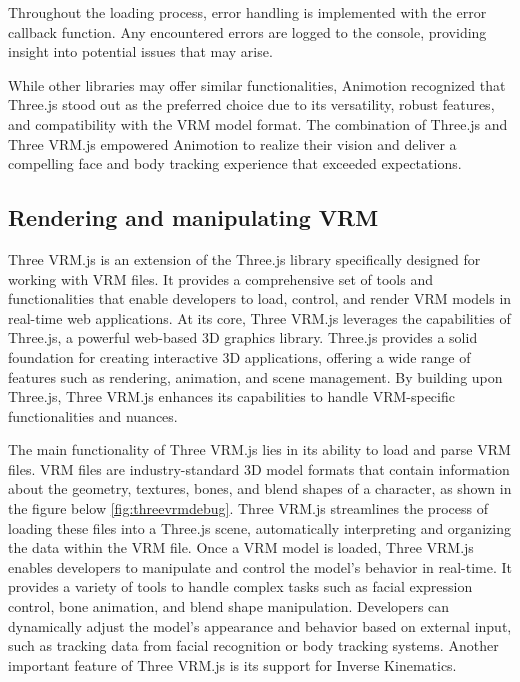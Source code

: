 Throughout the loading process, error handling is implemented with the error callback function. Any encountered errors 
are logged to the console, providing insight into potential issues that may arise.

While other libraries may offer similar functionalities, Animotion recognized that 
Three.js stood out as the preferred choice due to its versatility, robust features, 
and compatibility with the VRM model format. The combination of Three.js and Three VRM.js 
empowered Animotion to realize their vision and deliver a compelling face and body 
tracking experience that exceeded expectations.

\subsection{Rendering and manipulating VRM}
Three VRM.js is an extension of the Three.js library specifically designed for working with VRM files. 
It provides a comprehensive set of tools and functionalities that enable developers to load, control, 
and render VRM models in real-time web applications. At its core, Three VRM.js leverages the capabilities 
of Three.js, a powerful web-based 3D graphics library. Three.js provides a solid foundation for creating 
interactive 3D applications, offering a wide range of features such as rendering, animation, and scene management. 
By building upon Three.js, Three VRM.js enhances its capabilities to handle VRM-specific functionalities and nuances.

The main functionality of Three VRM.js lies in its ability to load and parse VRM files. 
VRM files are industry-standard 3D model formats that contain information about the geometry, 
textures, bones, and blend shapes of a character, as shown in the figure below \ref{fig:threevrmdebug}. Three VRM.js streamlines the process of loading 
these files into a Three.js scene, automatically interpreting and organizing the data within the VRM file.
Once a VRM model is loaded, Three VRM.js enables developers to manipulate and control the model's 
behavior in real-time. It provides a variety of tools to handle complex tasks such as facial expression 
control, bone animation, and blend shape manipulation. Developers can dynamically adjust the model's 
appearance and behavior based on external input, such as tracking data from facial recognition or body tracking systems.
Another important feature of Three VRM.js is its support for Inverse Kinematics. \cite{threevrm}


